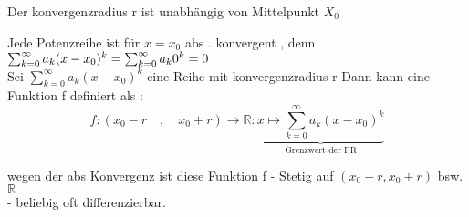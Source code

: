 \begin{remark}
Der konvergenzradius r ist unabhängig von Mittelpunkt $X_0$  
\end{remark}

\begin{remark}
Jede Potenzreihe ist für $x = x_0$ abs . konvergent , denn $\sum_{k=0}^{\infty}{a_k(x-x_0)^k} \\
= \sum_{k=0}^{\infty}{a_k 0^k} = 0$\\
Sei $\sum_{k=0}^{\infty}{a_k(x-x_0)^k}$ eine Reihe mit konvergenzradius r Dann kann eine Funktion f definiert  als : \\
 \[f : ( x_0 - r \quad ,\quad x_0 +r ) \rightarrow \mathbb{R} : \underbrace{x \longmapsto \sum_{k=0}^{\infty}{a_k(x-x_0)^k}}_{\text{Grenzwert der PR}}  \]
\end{remark} 

\begin{remark}
wegen der abs Konvergenz ist diese Funktion f 
- Stetig auf $( x_0 - r , x_0 + r)$ bsw. $\mathbb{R}$\\
- beliebig oft differenzierbar. 
\end{remark}

